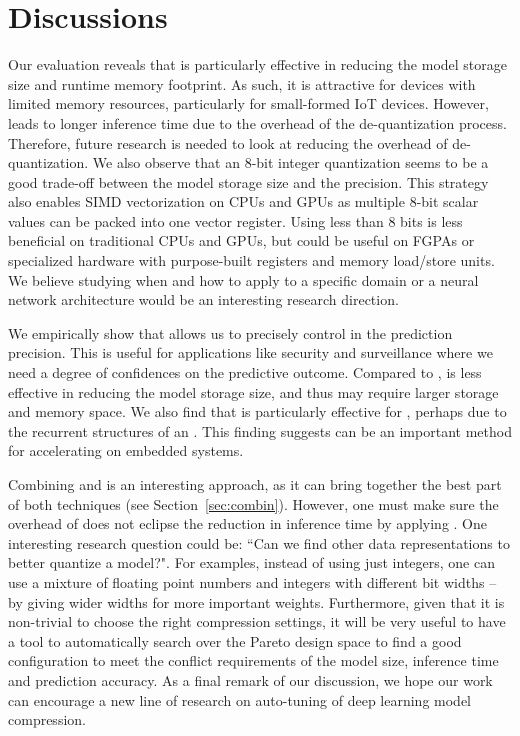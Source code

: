 \section{Discussions}

Our evaluation reveals that \dquantization is particularly effective in reducing the model storage size and runtime memory footprint. As
such, it is attractive for devices with limited memory resources, particularly for small-formed IoT devices. However, \quantization leads
to longer inference time due to the overhead of the de-quantization process. Therefore, future research is needed to look at reducing the
overhead of de-quantization. We also observe that an 8-bit integer quantization seems to be a good trade-off between the model storage size
and the precision. This strategy also enables SIMD vectorization on CPUs and GPUs as multiple 8-bit scalar values can be packed into one
vector register. Using less than 8 bits is less beneficial on traditional CPUs and GPUs, but could be useful on FGPAs or specialized
hardware with purpose-built registers and memory load/store units. We believe studying when and how to apply \dquantization to a specific
domain or a neural network architecture would be an interesting research direction.

We empirically show that \pruning allows us to precisely control in the prediction precision. This is useful for applications like security
and surveillance where we need a degree of confidences on the predictive outcome. Compared to \dquantization, \pruning is less effective in
reducing the model storage size, and thus may require larger storage and memory space. We also find that \pruning is particularly effective
for \RNNs, perhaps due to the recurrent structures of an \RNN. This finding suggests \pruning can be an important method for accelerating
\RNN on embedded systems.

Combining \dquantization and \pruning is an interesting approach, as it can bring together the best part of both techniques (see
Section~\ref{sec:combin}). However, one must  make sure the overhead of \dquantization does not eclipse the reduction in inference time by
applying \pruning. One interesting research question could be: ``Can we find other data representations to better quantize a model?". For
examples, instead of using just integers, one can use a mixture of floating point numbers and integers with different bit widths – by
giving wider widths for more important weights. Furthermore, given that it is non-trivial to choose the right compression settings, it will
be very useful to have a tool to automatically search over the Pareto design space to find a good configuration to meet the conflict
requirements of the model size, inference time and prediction accuracy.  As a final remark of our discussion, we hope our work can
encourage a new line of research on auto-tuning of deep learning model compression.
